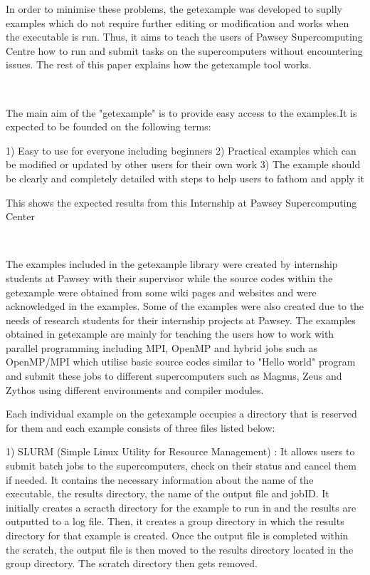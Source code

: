 \begin{Document}
{\begin{Introduction}
In order to minimise these problems, the getexample was developed to suplly examples which do not require further editing or modification and works
when the executable is run. Thus, it aims to teach the users of Pawsey Supercomputing Centre how to run and submit tasks on the supercomputers without 
encountering issues. The rest of this paper explains how the getexample tool works.   


\end{Introduction}
\
\

The main aim of the "getexample" is to provide easy access to the examples.It is expected to be founded on the following terms:

1) Easy to use for everyone including beginners
2) Practical examples which can be modified or updated by other users for their own work
3) The example should be clearly and completely detailed with steps to help users to fathom and apply it

\Section{Scope}
\begin{scope}

This shows the expected results from this Internship at Pawsey Supercomputing Center
\
\



\end{scope}
\

The examples included in the getexample library were created by internship students at Pawsey with their supervisor while the source codes within the
getexample were obtained from some wiki pages and websites and were acknowledged in the examples. Some of the examples were also created due to the
needs of research students for their internship projects at Pawsey. The examples obtained in getexample are mainly for teaching the users how to work
with parallel programming including MPI, OpenMP and hybrid jobs such as OpenMP/MPI which utilise basic source codes similar to "Hello world" program and
submit these jobs to different supercomputers such as Magnus, Zeus and Zythos using different environments and compiler modules. 

Each individual example on the getexample occupies a directory that is reserved for them and each example consists of three files listed below:
    
1) SLURM (Simple Linux Utility for Resource Management) : It allows users to submit batch jobs to the supercomputers, check on their status and cancel 
them if needed. It contains the necessary information about the name of the executable, the results directory, the name of the output file and jobID. It 
initially creates a scracth directory for the example to run in and the results are outputted to a log file. Then, it creates a group directory in which
the results directory for that example is created. Once the output file is completed within the scratch, the output file is then moved to the results
directory located in the group directory. The scratch directory then gets removed.

}
\end{Document}
